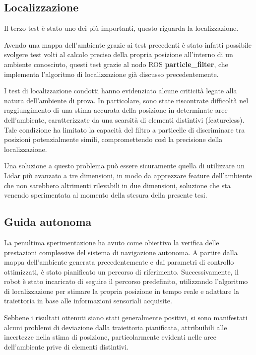 \subsection{Localizzazione}
Il terzo test è stato uno dei più importanti, questo riguarda la localizzazione.

\noindent Avendo una mappa dell'ambiente grazie ai test precedenti è stato infatti possibile svolgere test volti al calcolo preciso della propria posizione all'interno di un ambiente conosciuto, questi test grazie al nodo ROS \textbf{particle\_filter}, che implementa l'algoritmo di localizzazione già discusso precedentemente.

\noindent I test di localizzazione condotti hanno evidenziato alcune criticità legate alla natura dell'ambiente di prova. In particolare, sono state riscontrate difficoltà nel raggiungimento di una stima accurata della posizione in determinate aree dell'ambiente, caratterizzate da una scarsità di elementi distintivi (featureless). Tale condizione ha limitato la capacità del filtro a particelle di discriminare tra posizioni potenzialmente simili, compromettendo così la precisione della localizzazione.

\noindent Una soluzione a questo problema può essere sicuramente quella di utilizzare un Lidar più avanzato a tre dimensioni, in modo da apprezzare feature dell'ambiente che non sarebbero altrimenti rilevabili in due dimensioni, soluzione che sta venendo sperimentata al momento della stesura della presente tesi.

\subsection{Guida autonoma}
La penultima sperimentazione ha avuto come obiettivo la verifica delle prestazioni complessive del sistema di navigazione autonoma. A partire dalla mappa dell'ambiente generata precedentemente e dai parametri di controllo ottimizzati, è stato pianificato un percorso di riferimento. Successivamente, il robot è stato incaricato di seguire il percorso predefinito, utilizzando l'algoritmo di localizzazione per stimare la propria posizione in tempo reale e adattare la traiettoria in base alle informazioni sensoriali acquisite.

\noindent Sebbene i risultati ottenuti siano stati generalmente positivi, si sono manifestati alcuni problemi di deviazione dalla traiettoria pianificata, attribuibili alle incertezze nella stima di posizione, particolarmente evidenti nelle aree dell'ambiente prive di elementi distintivi.

